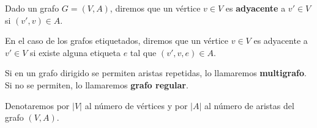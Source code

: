\begin{definicion}
  Dado un grafo $G=(V,A)$, diremos que un vértice $v \in V$ es \textbf{adyacente}
  a $v' \in V$ si $(v',v) \in A$. 

  En el caso de los grafos etiquetados, diremos que un vértice $v \in V$ es 
  adyacente a $v' \in V$ si existe alguna etiqueta $e$ tal que $(v',v,e) \in A$.
\end{definicion}

\begin{definicion}
  Si en un grafo dirigido se permiten aristas repetidas, lo llamaremos 
  \textbf{multigrafo}. Si no se permiten, lo llamaremos \textbf{grafo regular}.
\end{definicion}

\begin{nota}
  Denotaremos por $|V|$ al número de vértices y por $|A|$ al número de aristas
  del grafo $(V,A)$.
\end{nota}

